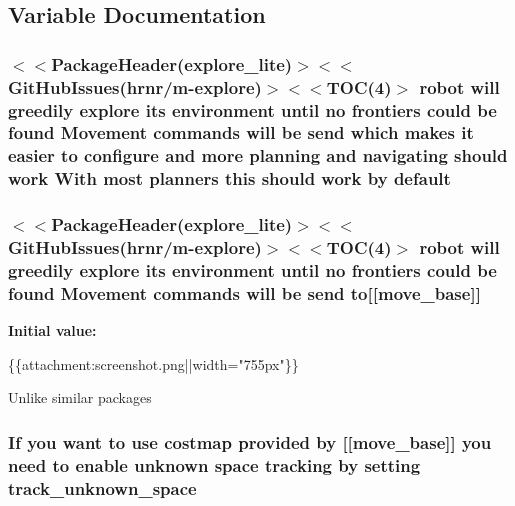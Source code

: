 \subsection{Variable Documentation}
\subsubsection[{\texorpdfstring{default}{default}}]{\setlength{\rightskip}{0pt plus 5cm}$<$$<$Package\+Header(explore\+\_\+lite)$>$$<$$<$Git\+Hub\+Issues(hrnr/m-\/explore)$>$$<$$<$T\+OC(4)$>$ robot will greedily explore its environment until no frontiers could be found Movement commands will be send which makes it easier {\bf to} configure and more planning and navigating should work With most planners this should work by default}\hypertarget{wiki__doc_8txt_a2da1dda6a041d7dbeb3aef440c695a60}{}\label{wiki__doc_8txt_a2da1dda6a041d7dbeb3aef440c695a60}
\subsubsection[{\texorpdfstring{to}{to}}]{\setlength{\rightskip}{0pt plus 5cm}$<$$<$Package\+Header(explore\+\_\+lite)$>$$<$$<$Git\+Hub\+Issues(hrnr/m-\/explore)$>$$<$$<$T\+OC(4)$>$ robot will greedily explore its environment until no frontiers could be found Movement commands will be send to\mbox{[}\mbox{[}move\+\_\+base\mbox{]}\mbox{]}}\hypertarget{wiki__doc_8txt_a59f010b39e38734a32109cf8c8310f81}{}\label{wiki__doc_8txt_a59f010b39e38734a32109cf8c8310f81}
{\bfseries Initial value\+:}
\begin{DoxyCode}
\{\{attachment:screenshot.png||width=\textcolor{stringliteral}{"755px"}\}\}

Unlike similar packages
\end{DoxyCode}
\subsubsection[{\texorpdfstring{track\+\_\+unknown\+\_\+space}{track_unknown_space}}]{\setlength{\rightskip}{0pt plus 5cm}If you want {\bf to} use costmap provided by \mbox{[}\mbox{[}move\+\_\+base\mbox{]}\mbox{]} you need {\bf to} enable unknown space tracking by setting track\+\_\+unknown\+\_\+space}\hypertarget{wiki__doc_8txt_aae8355eda2c5eda5fc33ae2b62ba937c}{}\label{wiki__doc_8txt_aae8355eda2c5eda5fc33ae2b62ba937c}
